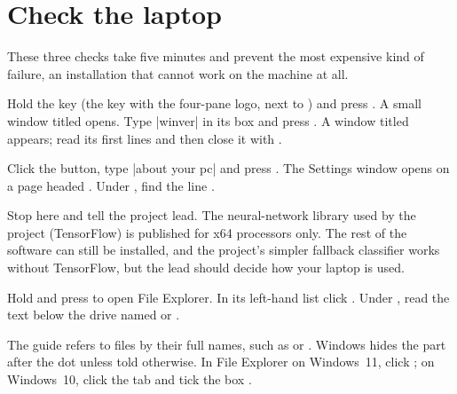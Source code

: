 \section{Check the laptop}
\label{sec:prelim}

These three checks take five minutes and prevent the most expensive kind of failure, an
installation that cannot work on the machine at all.

Hold the  key (the key with the four-pane logo, next to ) and press
. A small window titled  opens. Type \code|winver| in its box and press
. A window titled  appears; read its first lines and then close it
with .

Click the  button, type \code|about your pc| and press . The Settings
window opens on a page headed . Under , find the line
.

\begin{iffail}
Stop here and tell the project lead. The neural-network library used by the project
(TensorFlow) is published for x64 processors only. The rest of the software can still be
installed, and the project's simpler fallback classifier works without TensorFlow, but the lead
should decide how your laptop is used.
\end{iffail}

Hold  and press  to open File Explorer. In its left-hand list click
. Under , read the text below the drive named
 or .

The guide refers to files by their full names, such as  or .
Windows hides the part after the dot unless told otherwise. In File Explorer on Windows~11,
click \then{}\then{}; on Windows~10, click the
 tab and tick the box .
